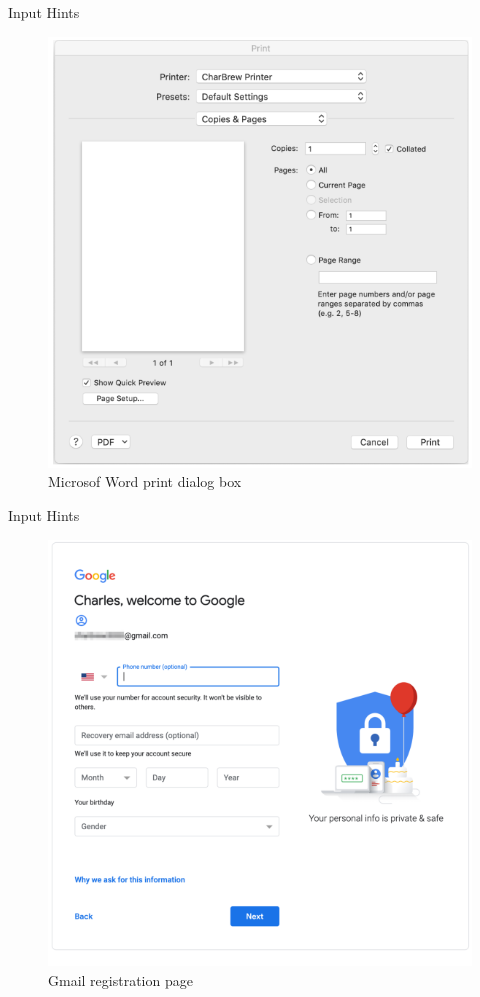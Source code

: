 \documentclass{beamer}
\begin{document}
\begin{frame}[t]{Input Hints}
	\begin{figure}[h]
		\centering
		\includegraphics[scale=0.6]{images/lec08-pic42.png}
		\caption{Microsof Word print dialog box}
	\end{figure}
\end{frame}

\begin{frame}[t]{Input Hints}
	\begin{figure}[h]
		\centering
		\includegraphics[scale=0.6]{images/lec08-pic43.png}
		\caption{Gmail registration page}
	\end{figure}
\end{frame}
\end{document}
